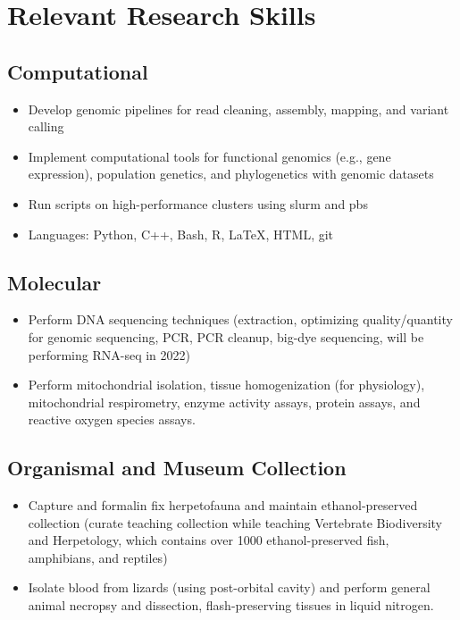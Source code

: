\documentclass[11pt,a4paper,sans]{moderncv}        %
\begin{document}
\section{Relevant Research Skills}
\subsection{Computational}
\begin{itemize}
	\item{Develop genomic pipelines for read cleaning, assembly, mapping, and variant calling}
	\item{Implement computational tools for functional genomics (e.g., gene expression), population genetics, and phylogenetics with genomic datasets}
	\item{Run scripts on high-performance clusters using slurm and pbs}
	\item{Languages:  Python, C++, Bash, R, LaTeX, HTML, git}
\end{itemize}
\subsection{Molecular}
\begin{itemize}
	\item{Perform DNA sequencing techniques (extraction, optimizing quality/quantity for genomic sequencing, PCR, PCR cleanup, big-dye sequencing, will be performing RNA-seq in 2022)}
	\item{Perform mitochondrial isolation, tissue homogenization (for physiology), mitochondrial respirometry, enzyme activity assays, protein assays, and reactive oxygen species assays.}
\end{itemize}
\subsection{Organismal and Museum Collection}
\begin{itemize}
	\item{Capture and formalin fix herpetofauna and maintain ethanol-preserved collection (curate teaching collection while teaching Vertebrate Biodiversity and Herpetology, which contains over 1000 ethanol-preserved fish, amphibians, and reptiles)}
	\item{Isolate blood from lizards (using post-orbital cavity) and perform general animal necropsy and dissection, flash-preserving tissues in liquid nitrogen.}
\end{itemize}
\end{document}
